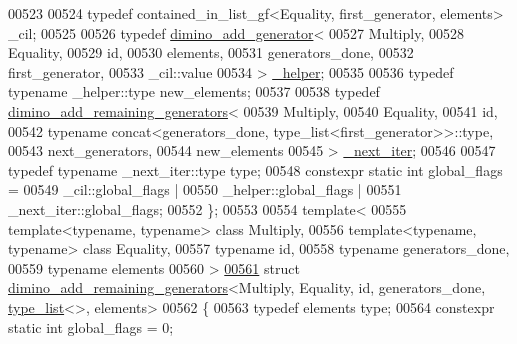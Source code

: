 \begin{DoxyCode}
00523 
00524   \textcolor{keyword}{typedef} contained\_in\_list\_gf<Equality, first\_generator, elements> \_cil;
00525 
00526   \textcolor{keyword}{typedef} \hyperlink{struct_eigen_1_1internal_1_1group__theory_1_1dimino__add__generator}{dimino\_add\_generator}<
00527     Multiply,
00528     Equality,
00529     id,
00530     elements,
00531     generators\_done,
00532     first\_generator,
00533     \_cil::value
00534   > \hyperlink{struct_eigen_1_1internal_1_1group__theory_1_1dimino__add__generator}{\_helper};
00535 
00536   \textcolor{keyword}{typedef} \textcolor{keyword}{typename} \_helper::type new\_elements;
00537 
00538   \textcolor{keyword}{typedef} \hyperlink{struct_eigen_1_1internal_1_1group__theory_1_1dimino__add__remaining__generators}{dimino\_add\_remaining\_generators}<
00539     Multiply,
00540     Equality,
00541     id,
00542     \textcolor{keyword}{typename} concat<generators\_done, type\_list<first\_generator>>::type,
00543     next\_generators,
00544     new\_elements
00545   > \hyperlink{struct_eigen_1_1internal_1_1group__theory_1_1dimino__add__remaining__generators}{\_next\_iter};
00546 
00547   \textcolor{keyword}{typedef} \textcolor{keyword}{typename} \_next\_iter::type type;
00548   constexpr \textcolor{keyword}{static} \textcolor{keywordtype}{int} global\_flags =
00549     \_cil::global\_flags |
00550     \_helper::global\_flags |
00551     \_next\_iter::global\_flags;
00552 \};
00553 
00554 \textcolor{keyword}{template}<
00555   \textcolor{keyword}{template}<\textcolor{keyword}{typename}, \textcolor{keyword}{typename}> \textcolor{keyword}{class }Multiply,
00556   \textcolor{keyword}{template}<\textcolor{keyword}{typename}, \textcolor{keyword}{typename}> \textcolor{keyword}{class }Equality,
00557   \textcolor{keyword}{typename} id,
00558   \textcolor{keyword}{typename} generators\_done,
00559   \textcolor{keyword}{typename} elements
00560 >
\hyperlink{struct_eigen_1_1internal_1_1group__theory_1_1dimino__add__remaining__generators_3_01_multiply_00d4c8f7ea21da2ce5b9e3ae885466184b}{00561} \textcolor{keyword}{struct }\hyperlink{struct_eigen_1_1internal_1_1group__theory_1_1dimino__add__remaining__generators}{dimino\_add\_remaining\_generators}<Multiply, Equality, id, 
      generators\_done, \hyperlink{struct_eigen_1_1internal_1_1type__list}{type\_list}<>, elements>
00562 \{
00563   \textcolor{keyword}{typedef} elements type;
00564   constexpr \textcolor{keyword}{static} \textcolor{keywordtype}{int} global\_flags = 0;

\end{DoxyCode}
